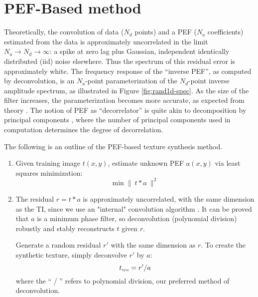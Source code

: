 \section{ PEF-Based method}

	Theoretically, the convolution of data ($N_d$ points) and a PEF ($N_a$ coefficients)
  estimated from the data is approximately uncorrelated in the limit 
	$N_a \rightarrow N_d \rightarrow \infty$: a spike at zero lag plus Gaussian, independent 
	identically distributed (iid) noise elsewhere.  
	Thus the spectrum of this residual error is approximately white.
	The frequency response of the ``inverse PEF'', as computed by deconvolution, is an 
	$N_a$-point parameterization of the $N_d$-point inverse amplitude spectrum, as illustrated 
	in Figure \ref{fig:rand1d-spec}.  As the size of the filter increases, the parameterization 
	becomes more accurate, as expected from theory {\small \cite{fgdp}}.  The notion of PEF
	as ``decorrelator'' is quite akin to decomposition by principal components 
	{\small \cite{castleman}},
	where the number of principal components used in computation determines the degree of 
	decorrelation.


	\par
	The following is an outline of the PEF-based texture synthesis method.
	\begin{enumerate}
		\item Given training image $t(x,y)$, estimate unknown PEF $a(x,y)$ via least 
		      squares minimization:
			\begin{equation}	
				\mbox{min} \; \| \ t*a \ \|^2  \label{eq:pefest}
			\end{equation}
		\item The residual $r = t*a$ is approximately uncorrelated, with the same dimension as the TI,
			since we use an "internal" convolution algorithm {\small \cite{gee}}.
			It can be proved that $a$ is a minimum phase filter, {\small \cite{fgdp}} so 
			deconvolution (polynomial division) robustly and stably reconstructs $t$ given $r$.

			Generate a random residual $r'$ with the same dimension as $r$.  To create the 
			synthetic texture, simply deconvolve $r'$ by $a$:
			\begin{equation}
				t_{\mbox{\tiny syn}} = r'/a  \label{eq:pefsyn}
			\end{equation}
			where the `` / '' refers to polynomial division, our preferred method of deconvolution.
	\end{enumerate}

